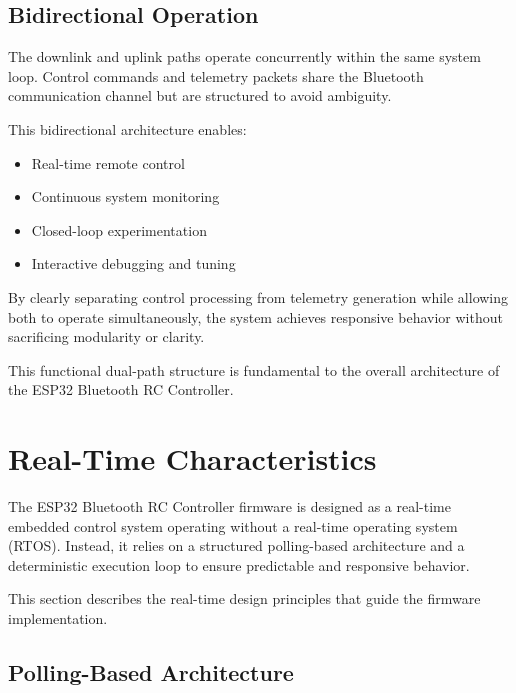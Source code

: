 \subsection{Bidirectional Operation}

The downlink and uplink paths operate concurrently within the same system loop. Control commands and telemetry packets share the Bluetooth communication channel but are structured to avoid ambiguity.

This bidirectional architecture enables:

\begin{itemize}
	\item Real-time remote control
	\item Continuous system monitoring
	\item Closed-loop experimentation
	\item Interactive debugging and tuning
\end{itemize}

By clearly separating control processing from telemetry generation while allowing both to operate simultaneously, the system achieves responsive behavior without sacrificing modularity or clarity.

This functional dual-path structure is fundamental to the overall architecture of the ESP32 Bluetooth RC Controller.
















\section{Real-Time Characteristics}

The ESP32 Bluetooth RC Controller firmware is designed as a real-time embedded control system operating without a real-time operating system (RTOS). Instead, it relies on a structured polling-based architecture and a deterministic execution loop to ensure predictable and responsive behavior.

This section describes the real-time design principles that guide the firmware implementation.

\subsection{Polling-Based Architecture}

